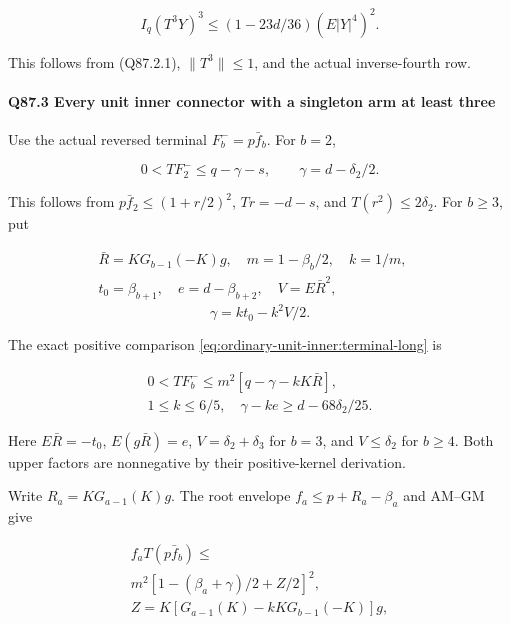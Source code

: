 \[
 I_q(T^3Y)^3\le(1-23d/36)(E|Y|^4)^2.
 \tag{Q87.2.3}\label{eq:Q87:2.3}
\]

This follows from (Q87.2.1), \(\|T^3\|\le\allowbreak 1\), and the actual
inverse-fourth row. 

\paragraph{Q87.3 Every unit inner connector with a singleton arm at least three}\label{part:Q87.3}

Use the actual reversed terminal \(F_b^-=\allowbreak p\bar f_b\). For \(b=\allowbreak 2\),

\[
 0<TF_2^-\le q-\gamma-s,\qquad \gamma=d-\delta_2/2.
 \tag{Q87.3.1}\label{eq:Q87:3.1}
\]

This follows from \(p\bar f_2\le\allowbreak (1+r/2)^2\), \(Tr=\allowbreak -d-s\),
and \(T(r^2)\le\allowbreak 2\delta_2\). For \(b\ge\allowbreak 3\), put

\[
\begin{gathered}
\bar R=KG_{b-1}(-K)g,\quad m=1-\beta_b/2,\quad k=1/m,\quad\\
t_0=\beta_{b+1},\quad e=d-\beta_{b+2},\quad V=E\bar R^2,
\end{gathered}
\]
\[
 \gamma=kt_0-k^2V/2.
\]

The exact positive comparison \eqref{eq:ordinary-unit-inner:terminal-long} is

\[
\begin{gathered}
0<TF_b^-\le m^2[q-\gamma-kK\bar R],\quad\\
1\le k\le6/5,\quad \gamma-ke\ge d-68\delta_2/25.
\end{gathered}\tag{Q87.3.2}\label{eq:Q87:3.2}
\]

Here \(E\bar R=\allowbreak -t_0\), \(E(g\bar R)=\allowbreak e\),
\(V=\allowbreak \delta_2+\delta_3\) for \(b=\allowbreak 3\), and \(V\le\allowbreak  \delta_2\) for \(b\ge\allowbreak 4\).
Both upper factors are nonnegative by their positive-kernel derivation.

Write \(R_a=\allowbreak KG_{a-1}(K)g\). The root envelope
\(f_a\le\allowbreak  p+R_a-\beta_a\) and AM–GM give

\[
\begin{gathered}
f_aT(p\bar f_b)\le\\
m^2[1-(\beta_a+\gamma)/2+Z/2]^2,\quad\\
Z=K[G_{a-1}(K)-kKG_{b-1}(-K)]g,
\end{gathered}\tag{Q87.3.3}\label{eq:Q87:3.3}
\]

